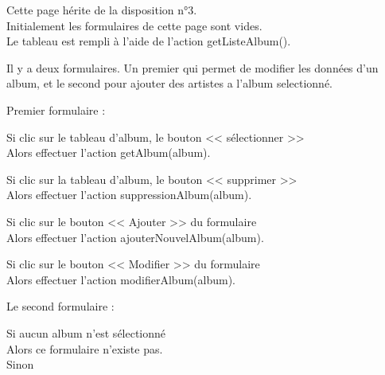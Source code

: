 			\begin{paragraphe}
				Cette page hérite de la disposition n°3. \\
				Initialement les formulaires de cette page sont vides. \\
				Le tableau est rempli à l'aide de l'action getListeAlbum().
			\end{paragraphe}


			\begin{paragraphe}
				Il y a deux formulaires. Un premier qui permet de modifier les données d'un album, et le second pour ajouter des artistes a l'album selectionné.
			\end{paragraphe}

			\begin{paragraphe}
				Premier formulaire :
			\end{paragraphe}

			\begin{paragraphe}
				Si clic sur le tableau d'album, le bouton << sélectionner >> \\
				Alors effectuer l'action getAlbum(album).
			\end{paragraphe}

			\begin{paragraphe}
				Si clic sur la tableau d'album, le bouton << supprimer >> \\
				Alors effectuer l'action suppressionAlbum(album).
			\end{paragraphe}

			\begin{paragraphe}
				Si clic sur le bouton << Ajouter >> du formulaire \\
				Alors effectuer l'action ajouterNouvelAlbum(album).
			\end{paragraphe}

			\begin{paragraphe}
				Si clic sur le bouton << Modifier >> du formulaire \\
				Alors effectuer l'action modifierAlbum(album).
			\end{paragraphe}

			\begin{paragraphe}
				Le second formulaire :
			\end{paragraphe}

			\begin{paragraphe}
				Si aucun album n'est sélectionné \\
				Alors ce formulaire n'existe pas. \\
				Sinon
			\end{paragraphe}

